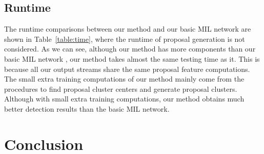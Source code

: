 \documentclass[10pt,journal,compsoc]{IEEEtran}
\begin{document}
{

\subsection{Runtime}
\label{sec:runtime}


\begin{table}[t]
\caption{Runtime comparisons between our method (``PCL'' in table) and our basic MIL network \cite{Ref:Bilen2016} (``Basic'' in table).}
{
\begin{center}
\footnotesize
{}
\end{center}
}
\label{table:time}
\end{table}

The runtime comparisons between our method and our basic MIL network \cite{Ref:Bilen2016} are shown in Table~\ref{table:time},
where the runtime of proposal generation is not considered.
As we can see,
although our method has more components than our basic MIL network \cite{Ref:Bilen2016},
our method takes almost the same testing time as it.
This is because all our output streams share the same proposal feature computations.
The small extra training computations of our method mainly
come from the procedures to find proposal cluster centers and generate proposal clusters.
Although with small extra training computations,
our method obtains much better detection results than the basic MIL network.

}



\section{Conclusion}
\label{sec:conclu}
\end{document}
